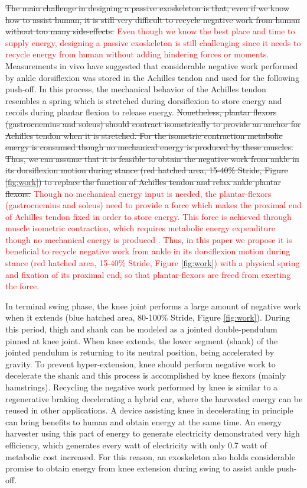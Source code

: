 \documentclass[twocolumn,cleanfoot,10pt]{asme2ej}
\begin{document}
\sout{The main challenge in designing a passive exoskeleton is that, even if we know how to assist human, it is still very difficult to recycle negative work from human without too many side-effects.}
\textcolor{red}{Even though we know the best place and time to supply energy, designing a passive exoskeleton is still challenging since it needs to recycle energy from human without adding hindering forces or moments.}
Measurements in vivo have suggested that considerable negative work performed by ankle dorsiflexion was stored in the Achilles tendon and used for the following push-off\cite{RN16}.
In this process, the mechanical behavior of the Achilles tendon resembles a spring which is stretched during dorsiflexion to store energy and recoils during plantar flexion to release energy.
\sout{Nonetheless, plantar flexors (gastrocnemius and soleus) should contract isometrically to provide an anchor for Achilles tendon when it is stretched. For the isometric contraction metabolic energy is consumed though no mechanical energy is produced by these muscles\cite{RN17}. Thus, we can assume that it is feasible to obtain the negative work from ankle in its dorsiflexion motion during stance (red hatched area, 15-40\% Stride, Figure \ref{fig:work}) to replace the function of Achilles tendon and relax ankle plantar flexors.}
\textcolor{red}{Though no mechanical energy input is needed, the plantar-flexors (gastrocnemius and soleus) need to provide a force which makes the proximal end of Achilles tendon fixed in order to store energy.
This force is achieved through muscle isometric contraction, which requires metabolic energy expenditure though no mechanical energy is produced \cite{RN17}.
Thus, in this paper we propose it is beneficial to recycle negative work from ankle in its dorsiflexion motion during stance (red hatched area, 15-40\% Stride, Figure \ref{fig:work}) with a physical spring and fixation of its proximal end, so that plantar-flexors are freed from exerting the force.}

In terminal swing phase, the knee joint performs a large amount of negative work when it extends (blue hatched area, 80-100\% Stride, Figure \ref{fig:work}).
During this period, thigh and shank can be modeled as a jointed double-pendulum pinned at knee joint\cite{RN2}.
When knee extends, the lower segment (shank) of the jointed pendulum is returning to its neutral position, being accelerated by gravity.
To prevent hyper-extension, knee should perform negative work to decelerate the shank and this process is accomplished by knee flexors (mainly hamstrings).
Recycling the negative work performed by knee is similar to a regenerative braking decelerating a hybrid car, where the harvested energy can be reused in other applications.
A device assisting knee in decelerating in principle can bring benefits to human and obtain energy at the same time.
An energy harvester using this part of energy to generate electricity demonstrated very high efficiency, which generates every watt of electricity with only 0.7 watt of metabolic cost increased\cite{RN18}.
For this reason, an exoskeleton also holds considerable promise to obtain energy from knee extension during swing to assist ankle push-off.
\end{document}
